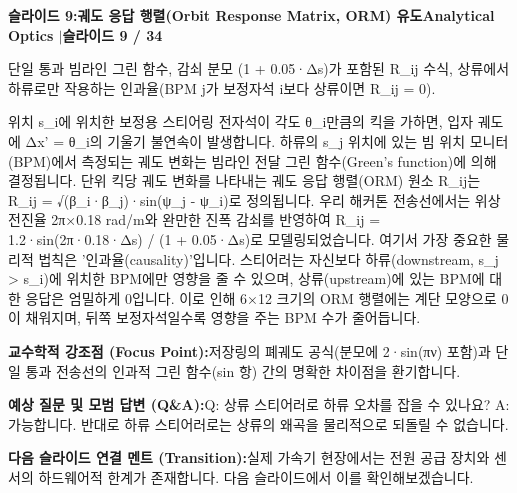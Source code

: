 \documentclass[11pt,a4paper]{article}
\begin{document}
\clearpage
\hypertarget{slide.9}{}
{}
\noindent\begin{tcolorbox}[colback=navy,colframe=navy,left=6pt,right=6pt,top=3pt,bottom=3pt,boxrule=0pt,arc=2pt]
{\large\bfseries\color{white}슬라이드 9:\enspace 궤도 응답 행렬(Orbit Response Matrix, ORM) 유도}\hfill{\footnotesize\bfseries\color{white!85!lightbg}Analytical Optics \enspace$|$\enspace 슬라이드 9 / 34}
\end{tcolorbox}
\vspace{0.2em}
\begin{tcolorbox}[colback=lightbg,colframe=bordergray,title={\footnotesize\bfseries\color{darkgray}슬라이드 시각 구성 요약},fontupper=\small,left=6pt,right=6pt,top=2.5pt,bottom=2.5pt,boxrule=0.6pt,arc=2.5pt]
단일 통과 빔라인 그린 함수, 감쇠 분모 (1 + 0.05·Δs)가 포함된 R\_ij 수식, 상류에서 하류로만 작용하는 인과율(BPM j가 보정자석 i보다 상류이면 R\_ij = 0).
\end{tcolorbox}
\vspace{0.2em}
\begin{tcolorbox}[colback=white,colframe=primaryblue,title={\footnotesize\bfseries\color{white}발표자 구두 대본 (Spoken Script)},fontupper=\small,left=6pt,right=6pt,top=3pt,bottom=3pt,boxrule=0.8pt,arc=2.5pt]
위치 s\_i에 위치한 보정용 스티어링 전자석이 각도 θ\_i만큼의 킥을 가하면, 입자 궤도에 Δx' = θ\_i의 기울기 불연속이 발생합니다. 하류의 s\_j 위치에 있는 빔 위치 모니터(BPM)에서 측정되는 궤도 변화는 빔라인 전달 그린 함수(Green's function)에 의해 결정됩니다. 단위 킥당 궤도 변화를 나타내는 궤도 응답 행렬(ORM) 원소 R\_ij는 R\_ij = √(β\_i·β\_j)·sin(ψ\_j - ψ\_i)로 정의됩니다. 우리 해커톤 전송선에서는 위상 전진율 2π×0.18 rad/m와 완만한 진폭 감쇠를 반영하여 R\_ij = 1.2·sin(2π·0.18·Δs) / (1 + 0.05·Δs)로 모델링되었습니다. 여기서 가장 중요한 물리적 법칙은 '인과율(causality)'입니다. 스티어러는 자신보다 하류(downstream, s\_j > s\_i)에 위치한 BPM에만 영향을 줄 수 있으며, 상류(upstream)에 있는 BPM에 대한 응답은 엄밀하게 0입니다. 이로 인해 6×12 크기의 ORM 행렬에는 계단 모양으로 0이 채워지며, 뒤쪽 보정자석일수록 영향을 주는 BPM 수가 줄어듭니다.
\end{tcolorbox}
\vspace{0.2em}
\begin{tcolorbox}[colback=lightbg,colframe=bordergray,left=6pt,right=6pt,top=3pt,bottom=3pt,boxrule=0.6pt,arc=2.5pt]
\small
\noindent\textbf{\color{navy}교수학적 강조점 (Focus Point):}\enspace 저장링의 폐궤도 공식(분모에 2·sin(πν) 포함)과 단일 통과 전송선의 인과적 그린 함수(sin 항) 간의 명확한 차이점을 환기합니다.\par\vspace{0.3em}
\noindent\textbf{\color{successgreen}예상 질문 및 모범 답변 (Q\&A):}\enspace Q: 상류 스티어러로 하류 오차를 잡을 수 있나요? A: 가능합니다. 반대로 하류 스티어러로는 상류의 왜곡을 물리적으로 되돌릴 수 없습니다.\par\vspace{0.3em}
\noindent\textbf{\color{accent}다음 슬라이드 연결 멘트 (Transition):}\enspace 실제 가속기 현장에서는 전원 공급 장치와 센서의 하드웨어적 한계가 존재합니다. 다음 슬라이드에서 이를 확인해보겠습니다.
\end{tcolorbox}
\end{document}
